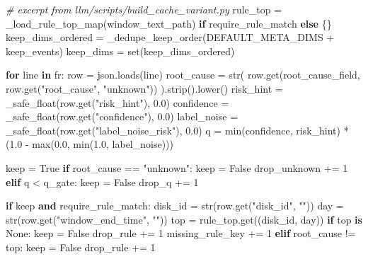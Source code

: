 \documentclass[
  11pt,
  a4paper]{article}
\newenvironment{Shaded}{}{}
\newcommand{\BuiltInTok}[1]{#1}
\newcommand{\CommentTok}[1]{\textcolor[rgb]{0.38,0.63,0.69}{\textit{#1}}}
\newcommand{\ControlFlowTok}[1]{\textcolor[rgb]{0.00,0.44,0.13}{\textbf{#1}}}
\newcommand{\DecValTok}[1]{\textcolor[rgb]{0.25,0.63,0.44}{#1}}
\newcommand{\FloatTok}[1]{\textcolor[rgb]{0.25,0.63,0.44}{#1}}
\newcommand{\KeywordTok}[1]{\textcolor[rgb]{0.00,0.44,0.13}{\textbf{#1}}}
\newcommand{\NormalTok}[1]{#1}
\newcommand{\OperatorTok}[1]{\textcolor[rgb]{0.40,0.40,0.40}{#1}}
\newcommand{\StringTok}[1]{\textcolor[rgb]{0.25,0.44,0.63}{#1}}
\newcommand{\VariableTok}[1]{\textcolor[rgb]{0.10,0.09,0.49}{#1}}
\begin{document}
\begin{Shaded}
\begin{Highlighting}[]
\CommentTok{\# excerpt from llm/scripts/build\_cache\_variant.py}
\NormalTok{rule\_top }\OperatorTok{=}\NormalTok{ \_load\_rule\_top\_map(window\_text\_path) }\ControlFlowTok{if}\NormalTok{ require\_rule\_match }\ControlFlowTok{else}\NormalTok{ \{\}}
\NormalTok{keep\_dims\_ordered }\OperatorTok{=}\NormalTok{ \_dedupe\_keep\_order(DEFAULT\_META\_DIMS }\OperatorTok{+}\NormalTok{ keep\_events)}
\NormalTok{keep\_dims }\OperatorTok{=} \BuiltInTok{set}\NormalTok{(keep\_dims\_ordered)}

\ControlFlowTok{for}\NormalTok{ line }\KeywordTok{in}\NormalTok{ fr:}
\NormalTok{    row }\OperatorTok{=}\NormalTok{ json.loads(line)}
\NormalTok{    root\_cause }\OperatorTok{=} \BuiltInTok{str}\NormalTok{(}
\NormalTok{        row.get(root\_cause\_field, row.get(}\StringTok{"root\_cause"}\NormalTok{, }\StringTok{"unknown"}\NormalTok{))}
\NormalTok{    ).strip().lower()}
\NormalTok{    risk\_hint }\OperatorTok{=}\NormalTok{ \_safe\_float(row.get(}\StringTok{"risk\_hint"}\NormalTok{), }\FloatTok{0.0}\NormalTok{)}
\NormalTok{    confidence }\OperatorTok{=}\NormalTok{ \_safe\_float(row.get(}\StringTok{"confidence"}\NormalTok{), }\FloatTok{0.0}\NormalTok{)}
\NormalTok{    label\_noise }\OperatorTok{=}\NormalTok{ \_safe\_float(row.get(}\StringTok{"label\_noise\_risk"}\NormalTok{), }\FloatTok{0.0}\NormalTok{)}
\NormalTok{    q }\OperatorTok{=} \BuiltInTok{min}\NormalTok{(confidence, risk\_hint) }\OperatorTok{*}\NormalTok{ (}\FloatTok{1.0} \OperatorTok{{-}} \BuiltInTok{max}\NormalTok{(}\FloatTok{0.0}\NormalTok{, }\BuiltInTok{min}\NormalTok{(}\FloatTok{1.0}\NormalTok{, label\_noise)))}

\NormalTok{    keep }\OperatorTok{=} \VariableTok{True}
    \ControlFlowTok{if}\NormalTok{ root\_cause }\OperatorTok{==} \StringTok{"unknown"}\NormalTok{:}
\NormalTok{        keep }\OperatorTok{=} \VariableTok{False}
\NormalTok{        drop\_unknown }\OperatorTok{+=} \DecValTok{1}
    \ControlFlowTok{elif}\NormalTok{ q }\OperatorTok{\textless{}}\NormalTok{ q\_gate:}
\NormalTok{        keep }\OperatorTok{=} \VariableTok{False}
\NormalTok{        drop\_q }\OperatorTok{+=} \DecValTok{1}

    \ControlFlowTok{if}\NormalTok{ keep }\KeywordTok{and}\NormalTok{ require\_rule\_match:}
\NormalTok{        disk\_id }\OperatorTok{=} \BuiltInTok{str}\NormalTok{(row.get(}\StringTok{"disk\_id"}\NormalTok{, }\StringTok{""}\NormalTok{))}
\NormalTok{        day }\OperatorTok{=} \BuiltInTok{str}\NormalTok{(row.get(}\StringTok{"window\_end\_time"}\NormalTok{, }\StringTok{""}\NormalTok{))}
\NormalTok{        top }\OperatorTok{=}\NormalTok{ rule\_top.get((disk\_id, day))}
        \ControlFlowTok{if}\NormalTok{ top }\KeywordTok{is} \VariableTok{None}\NormalTok{:}
\NormalTok{            keep }\OperatorTok{=} \VariableTok{False}
\NormalTok{            drop\_rule }\OperatorTok{+=} \DecValTok{1}
\NormalTok{            missing\_rule\_key }\OperatorTok{+=} \DecValTok{1}
        \ControlFlowTok{elif}\NormalTok{ root\_cause }\OperatorTok{!=}\NormalTok{ top:}
\NormalTok{            keep }\OperatorTok{=} \VariableTok{False}
\NormalTok{            drop\_rule }\OperatorTok{+=} \DecValTok{1}


\end{Highlighting}
\end{Shaded}
\end{document}
